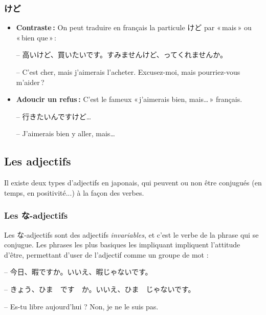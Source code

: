         \subsubsection{けど}

    \begin{itemize}
        \item \textbf{Contraste :} On peut traduire en français la particule けど par « mais » ou « bien que » :
        
        \begin{tcolorbox}
            -- 高いけど、買いたいです。すみませんけど、ってくれませんか。

            -- C’est cher, mais j’aimerais l’acheter. Excusez-moi, mais pourriez-vous m'aider ?
        \end{tcolorbox}

        \item \textbf{Adoucir un refus :} C’est le fameux « j’aimerais bien, mais\dots » français.
        
        \begin{tcolorbox}
            -- 行きたいんですけど\dots

            -- J’aimerais bien y aller, mais\dots
        \end{tcolorbox}
    \end{itemize}

    \subsection{Les adjectifs}

    Il existe deux types d'adjectifs en japonais, qui peuvent ou non être conjugués (en temps, en positivité...) à la façon des verbes.

        \subsubsection{Les な-adjectifs}

    Les な-adjectifs sont des adjectifs \textit{invariables}, et c'est le verbe de la phrase qui se conjugue. Les phrases les plus basiques les impliquant impliquent l'attitude d'être, permettant d'user de l'adjectif comme un groupe de mot :
        
    \begin{tcolorbox}
        -- 今日、暇ですか。いいえ、暇じゃないです。

        -- きょう、ひま　です　か。いいえ、ひま　じゃないです。

        -- Es-tu libre aujourd'hui ? Non, je ne le suis pas.
    \end{tcolorbox}

